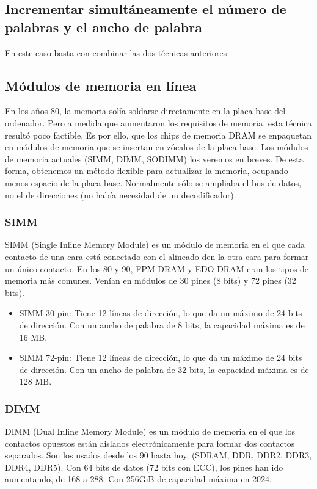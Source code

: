 \subsection{Incrementar simultáneamente el número de palabras y el ancho de palabra}
En este caso basta con combinar las dos técnicas anteriores
\begin{center}
    
\end{center}
\subsection{Módulos de memoria en línea}
En los años 80, la memoria solía soldarse directamente en la placa base del ordenador. Pero a medida
que aumentaron los requisitos de memoria, esta técnica resultó poco factible. Es por ello, que los chips de memoria
DRAM se enpaquetan en módulos de memoria que se insertan en zócalos de la placa base. Los módulos de memoria
actuales (SIMM, DIMM, SODIMM) los veremos en breves.
De esta forma, obtenemos un método flexible para actualizar la memoria, ocupando menos espacio de la placa base.
Normalmente sólo se ampliaba el bus de datos, no el de direcciones (no había necesidad de un decodificador).
\subsubsection{SIMM}
SIMM (Single Inline Memory Module) es un módulo de memoria  en el que 
cada contacto de una cara está conectado con el alineado den la otra cara para formar un único contacto.
En los 80 y 90, FPM DRAM y EDO DRAM eran los tipos de memoria más comunes.
Venían en módulos de 30 pines (8 bits) y 72 pines (32 bits).
\begin{itemize}
    \item SIMM 30-pin: Tiene 12 líneas de dirección, lo que da un máximo de 24 bits de dirección. Con un ancho de palabra de 8 bits, la capacidad máxima es de 16 MB.
    \item SIMM 72-pin: Tiene 12 líneas de dirección, lo que da un máximo de 24 bits de dirección. Con un ancho de palabra de 32 bits, la capacidad máxima es de 128 MB.
\end{itemize}
\subsubsection{DIMM}
DIMM (Dual Inline Memory Module) es un módulo de memoria en el que los contactos opuestos están aislados electrónicamente para formar dos contactos separados. 
Son los usados desde los 90 hasta hoy, (SDRAM, DDR, DDR2, DDR3, DDR4, DDR5).
Con 64 bits de datos (72 bits con ECC), los pines han ido aumentando, de 168 a 288. Con 256GiB de capacidad máxima en 2024.
